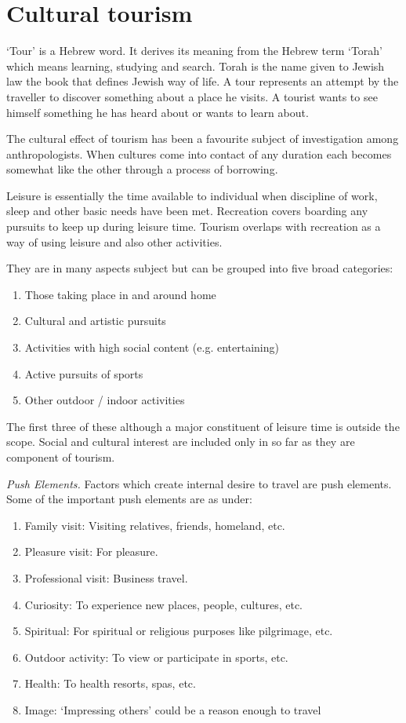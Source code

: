 \chapter{Cultural tourism} %
\label{cha:ct}

`Tour' is a Hebrew word. It derives its meaning from the Hebrew term `Torah' which means learning, studying and search. Torah is the name given to Jewish law the book that defines Jewish way of life. A tour represents an attempt by the traveller to discover something about a place he visits. A tourist wants to see himself something he has heard about or wants to learn about.

The cultural effect of tourism has been a favourite subject of investigation among anthropologists. When cultures come into contact of any duration each becomes somewhat like the other through a process of borrowing.

Leisure is essentially the time available to individual when discipline of work, sleep and other basic needs have been met. Recreation covers boarding any pursuits to keep up during leisure time. Tourism overlaps with recreation as a way of using leisure and also other activities.

They are in many aspects subject but can be grouped into five broad categories:

\begin{enumerate}[noitemsep]
  \item Those taking place in and around home
  \item Cultural and artistic pursuits
  \item Activities with high social content (e.g. entertaining)
  \item Active pursuits of sports
  \item Other outdoor / indoor activities
\end{enumerate}

\noindent The first three of these although a major constituent of leisure time is outside the scope. Social and cultural interest are included only in so far as they are component of tourism.

\emph{Push Elements.} Factors which create internal desire to travel are push elements. Some of the important push elements are as under:

\begin{enumerate}[noitemsep]
  \item Family visit: Visiting relatives, friends, homeland, etc.
  \item Pleasure visit: For pleasure.
  \item Professional visit: Business travel.
  \item Curiosity: To experience new places, people, cultures, etc.
  \item Spiritual: For spiritual or religious purposes like pilgrimage, etc.
  \item Outdoor activity: To view or participate in sports, etc.
  \item Health: To health resorts, spas, etc.
  \item Image: `Impressing others' could be a reason enough to travel
\end{enumerate}

